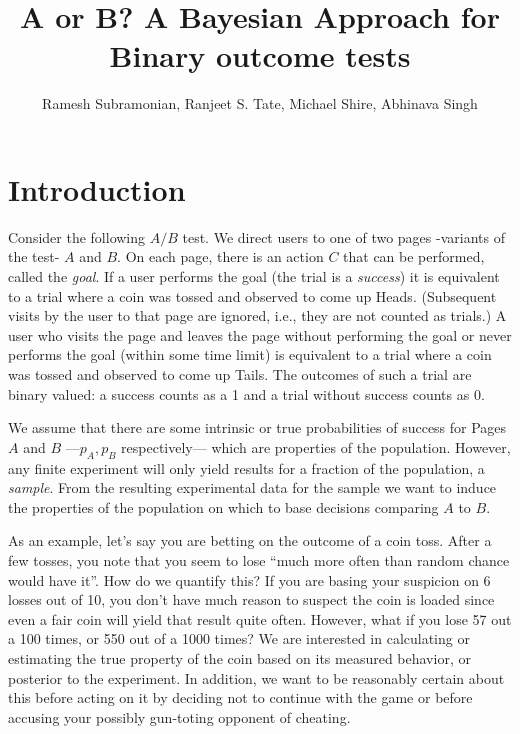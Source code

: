 \documentclass[12pt]{report}
\begin{document}
\title{A or B? A Bayesian Approach for Binary outcome tests}
\author{Ramesh Subramonian, Ranjeet S. Tate, Michael Shire, Abhinava Singh}
\date{}
\maketitle

\section{Introduction\label{sec:Intro}}

Consider the following \(A/B\) test. We direct users to one of two pages
-variants of the test- \(A\) and \(B\). On each page, there is an
action \(C\) that can be performed, called the {\em goal}. If a user
performs the goal (the trial is a {\em success}) it is equivalent to a
trial where a coin was tossed and observed to come up
Heads. (Subsequent visits by the user to that page are ignored, i.e.,
they are not counted as trials.) A user who visits the page and leaves
the page without performing the goal or never performs the goal
(within some time limit) is equivalent to a trial where a coin was
tossed and observed to come up Tails. The outcomes of such a trial are
binary valued: a success counts as a 1 and a trial without success
counts as 0.

We assume that there are some intrinsic or true probabilities of
success for Pages \(A\) and \(B\) ---\(p_A, p_B\) respectively--- which
are properties of the population. However, any finite experiment will
only yield results for a fraction of the population, a
{\em sample}. From the resulting experimental data for the sample we
want to induce the properties of the population on which to base decisions comparing \(A\) to \(B\).

As an example, let's say you are betting on the outcome of a coin
toss.  After a few tosses, you note that you seem to lose ``much more
often than random chance would have it''. How do we quantify this? If
you are basing your suspicion on 6 losses out of 10, you don't have
much reason to suspect the coin is loaded since even a fair coin will
yield that result quite often.  However, what if you lose 57 out a 100
times, or 550 out of a 1000 times?  We are interested in calculating
or estimating the true property of the coin based on its measured
behavior, or posterior to the experiment. In addition, we want to be
reasonably certain about this before acting on it by deciding not to
continue with the game or before accusing your possibly gun-toting
opponent of cheating.
\end{document}
